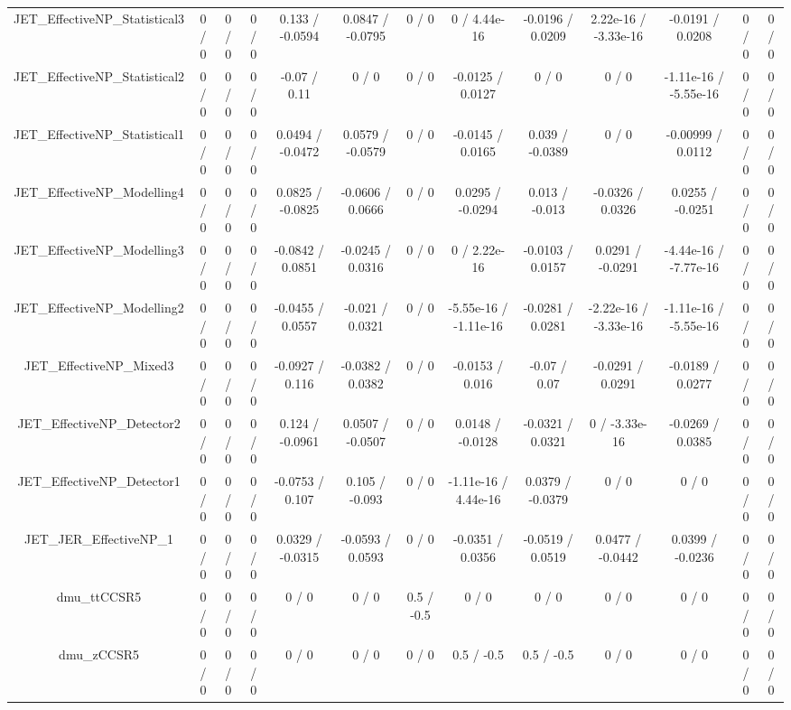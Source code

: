 \documentclass[10pt]{article}
\begin{document}
\begin{table}[htbp]
\begin{center}
\begin{tabular}{|c|c|c|c|c|c|c|c|c|c|c|c|c|}
  JET_EffectiveNP_Statistical3 & 0 / 0 & 0 / 0 & 0 / 0 & 0.133 / -0.0594 & 0.0847 / -0.0795 & 0 / 0 & 0 / 4.44e-16 & -0.0196 / 0.0209 & 2.22e-16 / -3.33e-16 & -0.0191 / 0.0208 & 0 / 0 & 0 / 0 \\ 
  JET_EffectiveNP_Statistical2 & 0 / 0 & 0 / 0 & 0 / 0 & -0.07 / 0.11 & 0 / 0 & 0 / 0 & -0.0125 / 0.0127 & 0 / 0 & 0 / 0 & -1.11e-16 / -5.55e-16 & 0 / 0 & 0 / 0 \\ 
  JET_EffectiveNP_Statistical1 & 0 / 0 & 0 / 0 & 0 / 0 & 0.0494 / -0.0472 & 0.0579 / -0.0579 & 0 / 0 & -0.0145 / 0.0165 & 0.039 / -0.0389 & 0 / 0 & -0.00999 / 0.0112 & 0 / 0 & 0 / 0 \\ 
  JET_EffectiveNP_Modelling4 & 0 / 0 & 0 / 0 & 0 / 0 & 0.0825 / -0.0825 & -0.0606 / 0.0666 & 0 / 0 & 0.0295 / -0.0294 & 0.013 / -0.013 & -0.0326 / 0.0326 & 0.0255 / -0.0251 & 0 / 0 & 0 / 0 \\ 
  JET_EffectiveNP_Modelling3 & 0 / 0 & 0 / 0 & 0 / 0 & -0.0842 / 0.0851 & -0.0245 / 0.0316 & 0 / 0 & 0 / 2.22e-16 & -0.0103 / 0.0157 & 0.0291 / -0.0291 & -4.44e-16 / -7.77e-16 & 0 / 0 & 0 / 0 \\ 
  JET_EffectiveNP_Modelling2 & 0 / 0 & 0 / 0 & 0 / 0 & -0.0455 / 0.0557 & -0.021 / 0.0321 & 0 / 0 & -5.55e-16 / -1.11e-16 & -0.0281 / 0.0281 & -2.22e-16 / -3.33e-16 & -1.11e-16 / -5.55e-16 & 0 / 0 & 0 / 0 \\ 
  JET_EffectiveNP_Mixed3 & 0 / 0 & 0 / 0 & 0 / 0 & -0.0927 / 0.116 & -0.0382 / 0.0382 & 0 / 0 & -0.0153 / 0.016 & -0.07 / 0.07 & -0.0291 / 0.0291 & -0.0189 / 0.0277 & 0 / 0 & 0 / 0 \\ 
  JET_EffectiveNP_Detector2 & 0 / 0 & 0 / 0 & 0 / 0 & 0.124 / -0.0961 & 0.0507 / -0.0507 & 0 / 0 & 0.0148 / -0.0128 & -0.0321 / 0.0321 & 0 / -3.33e-16 & -0.0269 / 0.0385 & 0 / 0 & 0 / 0 \\ 
  JET_EffectiveNP_Detector1 & 0 / 0 & 0 / 0 & 0 / 0 & -0.0753 / 0.107 & 0.105 / -0.093 & 0 / 0 & -1.11e-16 / 4.44e-16 & 0.0379 / -0.0379 & 0 / 0 & 0 / 0 & 0 / 0 & 0 / 0 \\ 
  JET_JER_EffectiveNP_1 & 0 / 0 & 0 / 0 & 0 / 0 & 0.0329 / -0.0315 & -0.0593 / 0.0593 & 0 / 0 & -0.0351 / 0.0356 & -0.0519 / 0.0519 & 0.0477 / -0.0442 & 0.0399 / -0.0236 & 0 / 0 & 0 / 0 \\ 
  dmu_ttCCSR5 & 0 / 0 & 0 / 0 & 0 / 0 & 0 / 0 & 0 / 0 & 0.5 / -0.5 & 0 / 0 & 0 / 0 & 0 / 0 & 0 / 0 & 0 / 0 & 0 / 0 \\ 
  dmu_zCCSR5 & 0 / 0 & 0 / 0 & 0 / 0 & 0 / 0 & 0 / 0 & 0 / 0 & 0.5 / -0.5 & 0.5 / -0.5 & 0 / 0 & 0 / 0 & 0 / 0 & 0 / 0 \\ 

\end{tabular}
\end{center}
\end{table}
\end{document}
